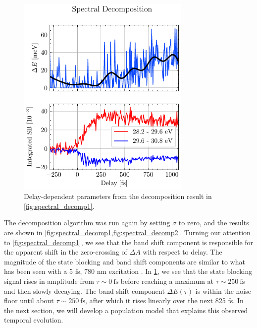 \begin{figure}
	\centering
	\includegraphics[width=0.75\textwidth]{figures/chap4/spectral_decomp2.pdf}
	\caption{Delay-dependent parameters from the decomposition result in \cref{fig:spectral_decomp1}.}
	\label{fig:spectral_decomp2}
\end{figure}

The decomposition algorithm was run again by setting $\sigma$ to zero, and the results are shown in \cref{fig:spectral_decomp1,fig:spectral_decomp2}. Turning our attention to \cref{fig:spectral_decomp1}, we see that the band shift component is responsible for the apparent shift in the zero-crossing of $\Delta A$ with respect to delay. The magnitude of the state blocking and band shift components are similar to what has been seen with a 5 fs, 780 nm excitation \cite{zurchDirectSimultaneousObservation2017}. In \cref{fig:spectral_decomp2}, we see that the state blocking signal rises in amplitude from $\tau \sim 0 \ \textrm{fs}$ before reaching a maximum at $\tau \sim 250 \ \textrm{fs}$ and then slowly decaying. The band shift component $\Delta E(\tau)$ is within the noise floor until about $\tau \sim 250 \ \textrm{fs}$, after which it rises linearly over the next 825 fs. In the next section, we will develop a population model that explains this observed temporal evolution.

